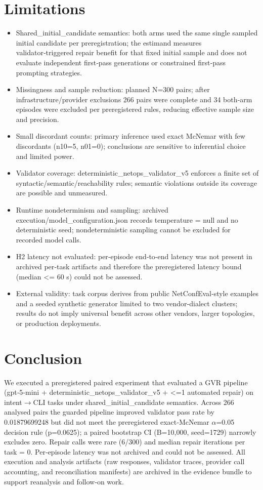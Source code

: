 \documentclass[conference]{IEEEtran}
\begin{document}
\section{Limitations}
\begin{itemize}
\item Shared\_initial\_candidate semantics: both arms used the same single sampled initial candidate per preregistration; the estimand measures validator‑triggered repair benefit for that fixed initial sample and does not evaluate independent first‑pass generations or constrained first‑pass prompting strategies.
\item Missingness and sample reduction: planned N=300 pairs; after infrastructure/provider exclusions 266 pairs were complete and 34 both‑arm episodes were excluded per preregistered rules, reducing effective sample size and precision.
\item Small discordant counts: primary inference used exact McNemar with few discordants (n10=5, n01=0); conclusions are sensitive to inferential choice and limited power.
\item Validator coverage: deterministic\_netops\_validator\_v5 enforces a finite set of syntactic/semantic/reachability rules; semantic violations outside its coverage are possible and unmeasured.
\item Runtime nondeterminism and sampling: archived execution/model\_configuration.json records temperature = null and no deterministic seed; nondeterministic sampling cannot be excluded for recorded model calls.
\item H2 latency not evaluated: per‑episode end‑to‑end latency was not present in archived per‑task artifacts and therefore the preregistered latency bound (median <= 60 s) could not be assessed.
\item External validity: task corpus derives from public NetConfEval‑style examples and a seeded synthetic generator limited to two vendor‑dialect clusters; results do not imply universal benefit across other vendors, larger topologies, or production deployments.
\end{itemize}

\section{Conclusion}
We executed a preregistered paired experiment that evaluated a GVR pipeline (gpt‑5‑mini + deterministic\_netops\_validator\_v5 + <=1 automated repair) on intent\ensuremath{\rightarrow}CLI tasks under shared\_initial\_candidate semantics. Across 266 analysed pairs the guarded pipeline improved validator pass rate by 0.01879699248 but did not meet the preregistered exact‑McNemar \ensuremath{\alpha}=0.05 decision rule (p=0.0625); a paired bootstrap CI (B=10,000, seed=1729) narrowly excludes zero. Repair calls were rare (6/300) and median repair iterations per task = 0. Per‑episode latency was not archived and could not be assessed. All execution and analysis artifacts (raw responses, validator traces, provider call accounting, and reconciliation manifests) are archived in the evidence bundle to support reanalysis and follow‑on work.
\end{document}
